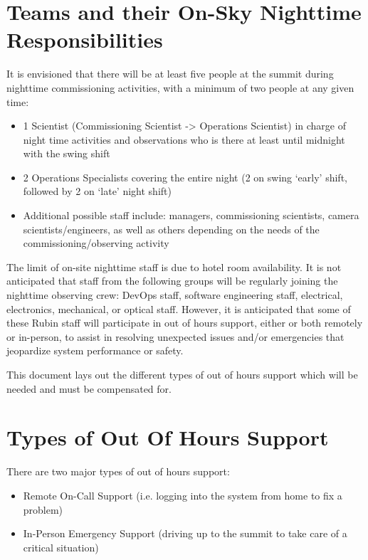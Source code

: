 \section{Teams and their On-Sky Nighttime Responsibilities}

It is envisioned that there will be at least five people at the summit during nighttime commissioning activities, with a minimum of two people at any given time:

\begin{itemize}
    \item 1 Scientist (Commissioning Scientist -> Operations Scientist) in charge of night time activities and observations who is there at least until midnight with the swing shift
    \item 2 Operations Specialists covering the entire night (2 on swing `early' shift, followed by 2 on `late' night shift)
    \item Additional possible staff include: managers, commissioning scientists, camera scientists/engineers, as well as others depending on the needs of the commissioning/observing activity
\end{itemize}

The limit of on-site nighttime staff is due to hotel room availability.  It is not anticipated that staff from the following groups will be regularly joining the nighttime observing crew: DevOps staff, software engineering staff, electrical, electronics, mechanical, or optical staff.
However, it is anticipated that some of these Rubin staff will participate in out of hours support, either or both remotely or in-person, to assist in resolving unexpected issues and/or emergencies that jeopardize system performance or safety.

This document lays out the different types of out of hours support which will be needed and must be compensated for.

\section{Types of Out Of Hours Support}

There are two major types of out of hours support:

\begin{itemize}
    \item Remote On-Call Support (i.e. logging into the system from home to fix a problem)
    \item In-Person Emergency Support (driving up to the summit to take care of a critical situation)
\end{itemize}

